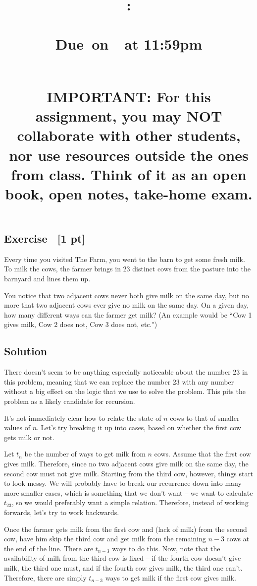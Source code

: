 \documentclass{article}
\title{
    \vspace{2in}
    \textbf{\hmwkClass:\\ \hmwkTitle} \\
    \normalsize\vspace{0.1in}\small{Due\ on\ \hmwkDueDate\ at 11:59pm} \\
    \vspace{0.1in}\large{\textit{\hmwkClassInstructor\ \hmwkSection}} \\
    \vspace{1in}
    \begin{minipage}[t]{0.5\columnwidth}
    {\footnotesize \textbf{IMPORTANT:} For this assignment, you may NOT collaborate with other students, nor use resources outside the ones from class. Think of it as an open book, open notes, take-home exam.}
    \end{minipage}
    \vspace{1in}
    \author{\textbf{\hmwkAuthorName}}
    \date{}
}
\newcounter{counter}
\newcommand{\Exercise}{Exercise \stepcounter{counter}\thecounter}
\begin{document}
    
\maketitle
\pagebreak

\subsection*{\Exercise \ {\bf [1 pt]}}
    \qquad Every time you visited The Farm, you went to the barn to get some fresh milk. To milk the cows, the farmer brings in $23$ distinct cows from the pasture into the barnyard and lines them up.

    \vspace{1.5mm}
    \qquad You notice that two adjacent cows never both give milk on the same day, but no more that two adjacent cows ever give no milk on the same day. On a given day, how many different ways can the farmer get milk? (An example would be ``Cow 1 gives milk, Cow 2 does not, Cow 3 does not, etc.")

\subsection*{Solution}
    \qquad There doesn't seem to be anything especially noticeable about the number 23 in this problem, meaning that we can replace the number 23 with any number without a big effect on the logic that we use to solve the problem. This pits the problem as a likely candidate for recursion.
    
    \vspace{2mm}
    \qquad It's not immediately clear how to relate the state of $n$ cows to that of smaller values of $n$. Let's try breaking it up into cases, based on whether the first cow gets milk or not.
    
    \vspace{2mm}
    \qquad Let $t_{n}$ be the number of ways to get milk from $n$ cows. Assume that the first cow gives milk. Therefore, since no two adjacent cows give milk on the same day, the second cow must not give milk. Starting from the third cow, however, things start to look messy. We will probably have to break our recurrence down into many more smaller cases, which is something that we don't want -- we want to calculate $t_{23}$, so we would preferably want a simple relation. Therefore, instead of working forwards, let's try to work backwards.
    
    \vspace{2mm}
    \qquad Once the farmer gets milk from the first cow and (lack of milk) from the second cow, have him skip the third cow and get milk from the remaining $n - 3$ cows at the end of the line. There are $t_{n - 3}$ ways to do this. Now, note that the availability of milk from the third cow is fixed -- if the fourth cow doesn't give milk, the third one must, and if the fourth cow gives milk, the third one can't. Therefore, there are simply $t_{n-3}$ ways to get milk if the first cow gives milk.
    
\end{document}
